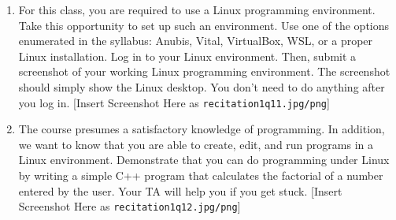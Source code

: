 \documentclass{article}
\begin{document}
\begin{enumerate}
    \item For this class, you are required to use a Linux programming environment. Take this opportunity to set up such an environment. Use one of the options enumerated in the syllabus: Anubis, Vital, VirtualBox, WSL, or a proper Linux installation. Log in to your Linux environment. Then, submit a screenshot of your working Linux programming environment. The screenshot should simply show the Linux desktop. You don’t need to do anything after you log in. [Insert Screenshot Here as \texttt{recitation1q11.jpg/png}]

    \item The course presumes a satisfactory knowledge of programming. In addition, we want to know that you are able to create, edit, and run programs in a Linux environment. Demonstrate that you can do programming under Linux by writing a simple C++ program that calculates the factorial of a number entered by the user. Your TA will help you if you get stuck.  [Insert Screenshot Here as \texttt{recitation1q12.jpg/png}]

\end{enumerate}
\end{document}
